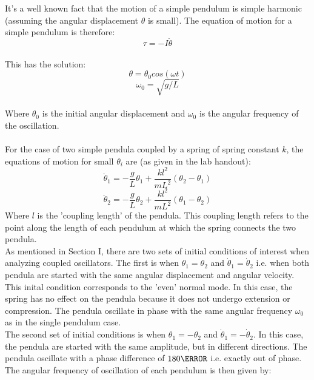 \documentclass[main.tex]{subfiles}
\begin{document}
It's a well known fact that the motion of a simple pendulum is simple harmonic (assuming the angular displacement $\theta$ is small). The equation of motion for a simple pendulum is therefore: 
\\
\begin{equation}
\tau = -I\ddot\theta
\end{equation}
\\
This has the solution:
\\
\begin{equation}
\theta = \theta_0 cos(\omega t)
\end{equation}
\begin{equation}
\omega_0 = \sqrt{g/L}
\end{equation}
\\
Where $\theta_0$ is the initial angular displacement and $\omega_0$ is the angular frequency of the oscillation.
\\\\
For the case of two simple pendula coupled by a spring of spring constant $k$, the equations of motion for small $\theta_i$ are (as given in the lab handout):
\\
\begin{equation}
\ddot\theta_1 = -\frac{g}{L}\theta_1 + \frac{kl^2}{mL^2}(\theta_2 - \theta_1)
\end{equation}
\begin{equation}
\ddot\theta_2 = -\frac{g}{L}\theta_2 + \frac{kl^2}{mL^2}(\theta_1 - \theta_2)
\end{equation}
Where $l$ is the 'coupling length' of the pendula. This coupling length refers to the point along the length of each pendulum at which the spring connects the two pendula. 
\\
As mentioned in Section I, there are two sets of initial conditions of interest when analyzing coupled oscillators. The first is when $\theta_1 = \theta_2$ and $\dot\theta_1 = \dot\theta_2$ i.e. when both pendula are started with the same angular displacement and angular velocity. This inital condition corresponds to the 'even' normal mode. In this case, the spring has no effect on the pendula because it does not undergo extension or compression. The pendula oscillate in phase with the same angular frequency $\omega_0$ as in the single pendulum case.
\\
The second set of initial conditions is when $\theta_1 = -\theta_2$ and $\dot\theta_1 = -\dot\theta_2$. In this case, the pendula are started with the same amplitude, but in different directions. The pendula oscillate with a phase difference of $180\degree$ i.e. exactly out of phase. The angular frequency of oscillation of each pendulum is then given by:
\end{document}
